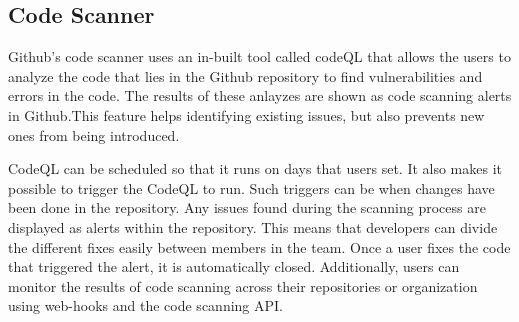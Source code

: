 \subsection{Code Scanner}
Github's code scanner uses an in-built tool called codeQL that allows the users to analyze the code that lies in the Github repository to find vulnerabilities and errors in the code. The results of these anlayzes are shown as code scanning alerts in Github.This feature helps identifying existing issues, but also prevents new ones from being introduced. \cite{CodeQL}

CodeQL can be scheduled so that it runs on days that users set. It also makes it possible to trigger the CodeQL to run. Such triggers can be when changes have been done in the repository. 
 Any issues found during the scanning process are displayed as alerts within the repository. This means that developers can divide the different fixes easily between members in the team.  Once a user fixes the code that triggered the alert, it is automatically closed. Additionally, users can monitor the results of code scanning across their repositories or organization using web-hooks and the code scanning API. 
\cite{GithubCodeScanning}




